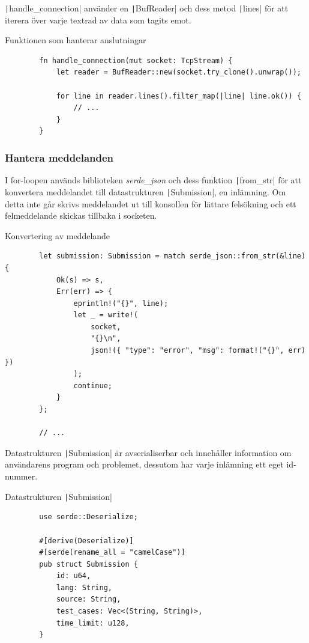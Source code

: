 \documentclass{article}
\begin{document}
\texttt|handle_connection| använder en
\texttt|BufReader| och dess metod
\texttt|lines| för att iterera över varje textrad av data som tagits emot.

\begin{listing}[H]
	\caption{Funktionen som hanterar anslutningar}
	\begin{verbatim}
		fn handle_connection(mut socket: TcpStream) {
			let reader = BufReader::new(socket.try_clone().unwrap());

			for line in reader.lines().filter_map(|line| line.ok()) {
				// ...
			}
		}
	\end{verbatim}
\end{listing}

\subsubsection{Hantera meddelanden}

I for-loopen används biblioteken \textit{serde\_json} och dess funktion
\texttt|from_str| för att konvertera meddelandet till datastrukturen
\texttt|Submission|, en inlämning. Om detta inte går skrivs meddelandet ut till
konsollen för lättare felsökning och ett felmeddelande skickas tillbaka i
socketen.

\begin{listing}[H]
	\caption{Konvertering av meddelande}
	\begin{verbatim}
		let submission: Submission = match serde_json::from_str(&line) {
			Ok(s) => s,
			Err(err) => {
				eprintln!("{}", line);
				let _ = write!(
					socket,
					"{}\n",
					json!({ "type": "error", "msg": format!("{}", err) })
				);
				continue;
			}
		};

		// ...
	\end{verbatim}
\end{listing}

Datastrukturen \texttt|Submission| är avserialiserbar och innehåller information
om användarens program och problemet, dessutom har varje inlämning ett eget
id-nummer.

\begin{listing}[H]
	\caption{Datastrukturen \texttt|Submission|}
	\begin{verbatim}
		use serde::Deserialize;

		#[derive(Deserialize)]
		#[serde(rename_all = "camelCase")]
		pub struct Submission {
			id: u64,
			lang: String,
			source: String,
			test_cases: Vec<(String, String)>,
			time_limit: u128,
		}
	\end{verbatim}
\end{listing}
\end{document}
